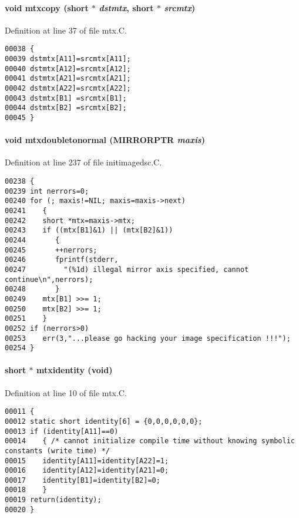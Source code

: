\paragraph{\setlength{\rightskip}{0pt plus 5cm}void mtxcopy (short $\ast$ {\em dstmtx}, short $\ast$ {\em srcmtx})}\hfill



Definition at line 37 of file mtx.C.\small\begin{verbatim}00038 {
00039 dstmtx[A11]=srcmtx[A11];
00040 dstmtx[A12]=srcmtx[A12];
00041 dstmtx[A21]=srcmtx[A21];
00042 dstmtx[A22]=srcmtx[A22];
00043 dstmtx[B1] =srcmtx[B1];
00044 dstmtx[B2] =srcmtx[B2];
00045 }
\end{verbatim}\normalsize 
\label{im.h_a16}
\paragraph{\setlength{\rightskip}{0pt plus 5cm}void mtxdoubletonormal ({\bf MIRRORPTR} {\em maxis})}\hfill



Definition at line 237 of file initimagedsc.C.\small\begin{verbatim}00238 {
00239 int nerrors=0;
00240 for (; maxis!=NIL; maxis=maxis->next)
00241    {
00242    short *mtx=maxis->mtx;
00243    if ((mtx[B1]&1) || (mtx[B2]&1))
00244       {
00245       ++nerrors;
00246       fprintf(stderr,
00247         "(%1d) illegal mirror axis specified, cannot continue\n",nerrors);
00248       }
00249    mtx[B1] >>= 1;
00250    mtx[B2] >>= 1;
00251    }
00252 if (nerrors>0)
00253    err(3,"...please go hacking your image specification !!!");
00254 }
\end{verbatim}\normalsize 
\label{im.h_a2}
\paragraph{\setlength{\rightskip}{0pt plus 5cm}short $\ast$ mtxidentity (void)}\hfill



Definition at line 10 of file mtx.C.\small\begin{verbatim}00011 {
00012 static short identity[6] = {0,0,0,0,0,0};
00013 if (identity[A11]==0)
00014    { /* cannot initialize compile time without knowing symbolic constants (write time) */
00015    identity[A11]=identity[A22]=1;
00016    identity[A12]=identity[A21]=0;
00017    identity[B1]=identity[B2]=0;
00018    }
00019 return(identity);
00020 }
\end{verbatim}\normalsize 
\label{im.h_a3}
